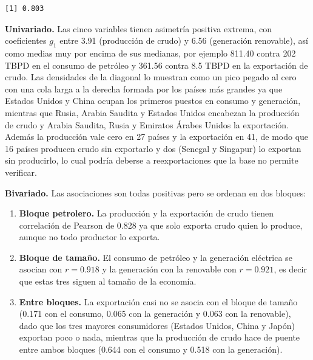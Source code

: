 \documentclass[oneside, openany, fontset=libertinus]{mitthesis}
\newenvironment{Shaded}{\begin{snugshade}}{\end{snugshade}}
\newcommand{\DecValTok}[1]{\textcolor[rgb]{0.68,0.00,0.00}{#1}}
\newcommand{\FunctionTok}[1]{\textcolor[rgb]{0.28,0.35,0.67}{#1}}
\newcommand{\NormalTok}[1]{\textcolor[rgb]{0.00,0.23,0.31}{#1}}
\newcommand{\OtherTok}[1]{\textcolor[rgb]{0.00,0.23,0.31}{#1}}
\newcommand{\SpecialCharTok}[1]{\textcolor[rgb]{0.37,0.37,0.37}{#1}}
\newcommand{\StringTok}[1]{\textcolor[rgb]{0.13,0.47,0.30}{#1}}
\providecommand{\tightlist}{\setlength{\itemsep}{0pt}\setlength{\parskip}{0pt}}
\newenvironment{codres}%
  {\par\smallskip\noindent\begin{minipage}[t]{0.57\linewidth}\vspace{0pt}}%
  {\end{minipage}\par\medskip}
\newcommand{\codressep}{\end{minipage}\hfill\begin{minipage}[t]{0.40\linewidth}\vspace{0pt}}
\begin{document}
\begin{codres}

\begin{Shaded}
\end{Shaded}

\codressep

\begin{verbatim}
[1] 0.803
\end{verbatim}

\end{codres}

\textbf{Univariado.} Las cinco variables tienen asimetría positiva
extrema, con coeficientes \(g_1\) entre 3.91 (producción de crudo) y
6.56 (generación renovable), así como medias muy por encima de sus
medianas, por ejemplo 811.40 contra 202 TBPD en el consumo de petróleo y
361.56 contra 8.5 TBPD en la exportación de crudo. Las densidades de la
diagonal lo muestran como un pico pegado al cero con una cola larga a la
derecha formada por los países más grandes ya que Estados Unidos y China
ocupan los primeros puestos en consumo y generación, mientras que Rusia,
Arabia Saudita y Estados Unidos encabezan la producción de crudo y
Arabia Saudita, Rusia y Emiratos Árabes Unidos la exportación. Además la
producción vale cero en 27 países y la exportación en 41, de modo que 16
países producen crudo sin exportarlo y dos (Senegal y Singapur) lo
exportan sin producirlo, lo cual podría deberse a reexportaciones que la
base no permite verificar.

\textbf{Bivariado.} Las asociaciones son todas positivas pero se ordenan
en dos bloques:

\begin{enumerate}
\def\labelenumi{\alph{enumi}.}
\tightlist
\item
  \textbf{Bloque petrolero.} La producción y la exportación de crudo
  tienen correlación de Pearson \parencite{pearson1895} de 0.828 ya que
  solo exporta crudo quien lo produce, aunque no todo productor lo
  exporta.
\item
  \textbf{Bloque de tamaño.} El consumo de petróleo y la generación
  eléctrica se asocian con \(r = 0.918\) y la generación con la
  renovable con \(r = 0.921\), es decir que estas tres siguen al tamaño
  de la economía.
\item
  \textbf{Entre bloques.} La exportación casi no se asocia con el bloque
  de tamaño (0.171 con el consumo, 0.065 con la generación y 0.063 con
  la renovable), dado que los tres mayores consumidores (Estados Unidos,
  China y Japón) exportan poco o nada, mientras que la producción de
  crudo hace de puente entre ambos bloques (0.644 con el consumo y 0.518
  con la generación).
\end{enumerate}
\end{document}
